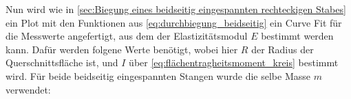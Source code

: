 \begin{table}
    \centering
    \caption{Messergebnisse zu dem beidseitig eingespannten zylindrischen Stab}
    \label{tab:beidseitig_rund}
\end{table}

Nun wird wie in \autoref{sec:Biegung eines beidseitig eingespannten rechteckigen Stabes} ein Plot mit den Funktionen aus \autoref{eq:durchbiegung_beidseitig} ein Curve Fit für die Messwerte angefertigt, aus dem der Elastizitätsmodul $E$ bestimmt werden kann. Dafür werden folgene Werte benötigt, wobei hier $R$ der Radius der Querschnittsfläche ist, und $I$ über \autoref{eq:flächentragheitsmoment_kreis} bestimmt wird. Für beide beidseitig eingespannten Stangen wurde die selbe Masse $m$ verwendet:

